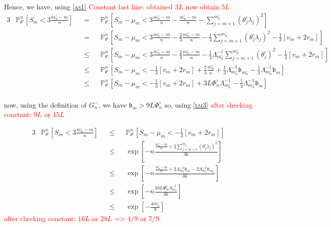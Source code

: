 Hence, we have,  using \textsc{\cref{as1}}
\textcolor{red}{Constant last line: obtained $3L$ now obtain $5L$}
\begin{alignat*}{3}
&\mathds{P}_{\theta^{\circ}}^{n}\left[S_{m} < 3 \frac{m_{n}^{\circ} - m}{n}\right] &&=&& \mathds{P}_{\theta^{\circ}}^{n}\left[S_{m} - \mu_{m} < 3 \frac{m_{n}^{\circ} - m}{n} - \frac{m_{n}^{\circ} - m}{n} - \sum\limits_{j = m+1}^{m_{n}^{\circ}}\left(\theta^{\circ}_{j}\lambda_{j}\right)^{2}\right]\\
& && = &&\mathds{P}_{\theta^{\circ}}^{n}\left[S_{m} - \mu_{m} < 3 \frac{m_{n}^{\circ} - m}{n} - \frac{2}{3}\frac{m_{n}^{\circ} - m}{n} - \frac{1}{3}\sum\limits_{j = m+1}^{m_{n}^{\circ}}\left(\theta^{\circ}_{j}\lambda_{j}\right)^{2} - \frac{1}{3} \left[v_{m} + 2 r_{m}\right]\right]\\
& &&\leq&& \mathds{P}_{\theta^{\circ}}^{n}\left[S_{m} - \mu_{m} < 3 \frac{m_{n}^{\circ} - m}{n} - \frac{2}{3}\frac{m_{n}^{\circ} - m}{n} - \frac{1}{3} \Lambda_{m_{n}^{\circ}}^{-1}\sum\limits_{j = m+1}^{m_{n}^{\circ}}\left(\theta^{\circ}_{j}\right)^{2} - \frac{1}{3} \left[v_{m} + 2 r_{m}\right]\right]\\
& &&\leq&& \mathds{P}_{\theta^{\circ}}^{n}\left[S_{m} - \mu_{m} <  - \frac{1}{3} \left[v_{m} + 2 r_{m}\right] + \frac{7}{3} \frac{m_{n}^{\circ}}{n} + \frac{1}{3} \Lambda_{m_{n}^{\circ}}^{-1} \mathfrak{b}_{m_{n}^{\circ}} - \frac{1}{3} \Lambda_{m_{n}^{\circ}}^{-1} \mathfrak{b}_{m}\right]\\
& &&\leq&& \mathds{P}_{\theta^{\circ}}^{n}\left[S_{m} - \mu_{m} < - \frac{1}{3} \left[v_{m} + 2 r_{m}\right] + 3 L \Phi_{n}^{\circ} \Lambda_{m_{n}^{\circ}}^{-1} - \frac{1}{3}\Lambda_{m_{n}^{\circ}}^{-1} \mathfrak{b}_{m}\right]\\
\end{alignat*}

now, using the definition of $G_{n}^{-}$, we have $\mathfrak{b}_{m} > 9 L \Phi_{n}^{\circ}$ so, using \textsc{\cref{lm3}} \textcolor{red}{after checking constant: $9L$ or $15 L$}

\begin{alignat*}{3}
&\mathds{P}_{\theta^{\circ}}^{n}\left[S_{m} < 3 \frac{m_{n}^{\circ} - m}{n}\right] && \leq && \mathds{P}_{\theta^{\circ}}^{n}\left[S_{m} - \mu_{m} < - \frac{1}{3} \left[v_{m} + 2 r_{m}\right]\right]\\
& &&\leq&& \exp\left[- n\frac{\frac{m_{n}^{\circ} - m}{n} + 2 \sum\limits_{j = m + 1}^{m_{n}^{\circ}}\left(\theta^{\circ}_{j}\lambda_{j}\right)^{2}}{36}\right]\\
& &&\leq&& \exp\left[- n\frac{\frac{m_{n}^{\circ} - m}{n} + 2 \Lambda_{m_{n}^{\circ}}^{-1} \mathfrak{b}_{m} - 2 \Lambda_{m_{n}^{\circ}}^{-1} \mathfrak{b}_{m_{n}^{\circ}}}{36}\right]\\
& &&\leq&& \exp\left[- n \frac{16 L \Phi_{n}^{\circ} \Lambda_{m_{n}^{\circ}}^{-1}}{36}\right]\\
& &&\leq&& \exp \left[ - \frac{4 m_{n}^{\circ}}{9} \right]
\end{alignat*}
\textcolor{red}{after checking constant: $16L$ or $28 L$ => $4/9$ or $7/9$}

